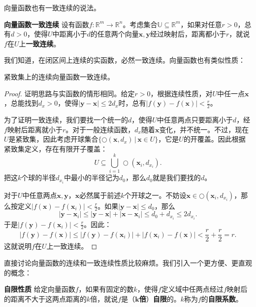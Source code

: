\documentclass[12pt,UTF8,fontset=none]{ctexbook}
\begin{document}
向量函数也有一致连续的说法。
\begin{df}{\textbf{向量函数一致连续}}
    设有函数$f:\mathbb{R}^m \rightarrow \mathbb{R}^n$。考虑集合$\mathbb{U}\subseteq \mathbb{R}^m$，如果对任意$r>0$，总有$d>0$，使得$U$中距离小于$d$的任意两个向量$\mathbf{x},\mathbf{y}$经过映射后，距离都小于$r$，就说$f$在$U$上\textbf{一致连续}。
\end{df}

我们知道，在闭区间上连续的实函数，必然一致连续。向量函数也有类似性质：
\begin{tm}
    紧致集上的连续向量函数一致连续。
\end{tm}

\begin{proof}
    证明思路与实函数的情形相同。给定$r>0$，根据连续性质，对$U$中任一点$\mathbf{x}$，总能找到$d_x > 0$，使得$|\mathbf{y} - \mathbf{x}| \leqslant 2d_x$时，总有$|f(\mathbf{y}) - f(\mathbf{x})| < \frac{r}{2}$。
    
    为了证明一致连续，我们要找一个统一的$d$，使得$U$中任意两点只要距离小于$d$，经$f$映射后距离就小于$r$。对于一般连续函数，$d_x$随着$\mathbf{x}$变化，并不统一。不过，现在$U$是紧致集，因此考虑开球集合$\{\bigcirc(\mathbf{x}, d_x) \, | \, \mathbf{x} \in U \}$，它是$U$的开覆盖。因此根据紧致集定义，存在有限开子覆盖：
    $$U\subseteq \bigcup_{i=1}^k \bigcirc(\mathbf{x}_i, d_{x_i}) .$$
    把这$k$个球的半径$d_{x_i}$中最小的半径记为$d_0$，那么$d_0$就是我们要找的$d$。

    对于$U$中任意两点$\mathbf{x},\mathbf{y}$，$\mathbf{x}$必然属于前述$k$个开球之一。不妨设$\mathbf{x}\in \bigcirc(\mathbf{x}_i, d_{x_i})$，那么按定义$|f(\mathbf{x}) - f(\mathbf{x}_i)| < \frac{r}{2}$。如果$|\mathbf{y} - \mathbf{x}| \leqslant d_0$，那么
    $$ |\mathbf{y} - \mathbf{x}_i| \leqslant |\mathbf{y} - \mathbf{x}| + |\mathbf{x} - \mathbf{x}_i| \leqslant d_0 + d_{x_i} \leqslant 2d_{x_i}. $$
    于是$|f(\mathbf{y}) - f(\mathbf{x}_i)| < \frac{r}{2}$。因此：
    $$ |f(\mathbf{y}) - f(\mathbf{x})| \leqslant |f(\mathbf{y}) - f(\mathbf{x}_i)| + |f(\mathbf{x}_i) - f(\mathbf{x})| < \frac{r}{2} + \frac{r}{2} = r.$$
    这就说明$f$在$U$上一致连续。
\end{proof}

直接讨论向量函数的连续和一致连续性质比较麻烦。我们引入一个更方便、更直观的概念：
\begin{df}{\textbf{自限性质}}
    给定向量函数$f$，如果有固定的数$k$，使得$f$定义域中任两点经过$f$映射后的距离不大于这两点距离的$k$倍，就说$f$是（$\boldsymbol{k}$\textbf{倍}）\textbf{自限}的。$k$称为$f$的\textbf{自限系数}。
\end{df}
\end{document}
